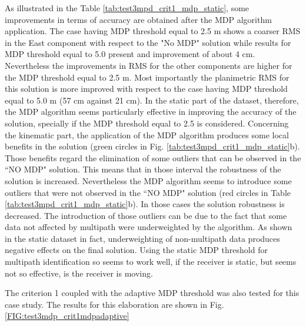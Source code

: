As illustrated in the Table \ref{tab:test3mpd_crit1_mdp_static}, some improvements in terms of accuracy are obtained after the MDP algorithm application. The case having MDP threshold equal to 2.5 m shows a coarser RMS in the East component with respect to the "No MDP" solution while results for MDP threshold equal to 5.0 present and improvement of about 4 cm. Nevertheless the improvements in RMS for the other components are higher for the MDP threshold equal to 2.5 m. Most importantly the planimetric RMS for this solution is more improved with respect to the case having MDP threshold equal to 5.0 m (57 cm against 21 cm). In the static part of the dataset, therefore, the MDP algorithm seems particularly effective in improving the accuracy of the solution, specially if the MDP threshold equal to 2.5 is considered.
Concerning the kinematic part, the application of the MDP algorithm produces some local benefits in the solution (green circles in Fig. \ref{tab:test3mpd_crit1_mdp_static}b). Those benefits regard the elimination of some outliers that can be observed in the ``NO MDP" solution. This means that in those interval the robustness of the solution is increased. Nevertheless the MDP algorithm seems to introduce some outliers that were not observed in the ``NO MDP" solution (red circles in Table \ref{tab:test3mpd_crit1_mdp_static}b). In those cases the solution robustness is decreased. The introduction of those outliers can be due to the fact that some data not affected by multipath were underweighted by the algorithm. As shown in the static dataset in fact, underweighting of non-multipath data produces negative effects on the final solution. Using the static MDP threshold for multipath identification so seems to work well, if the receiver is static, but seems not so effective, is the receiver is moving.  

The criterion 1 coupled with the adaptive MDP threshold was also tested for this case study. The results for this elaboration are shown in Fig. \ref{FIG:test3mdp_crit1mdpadaptive}

